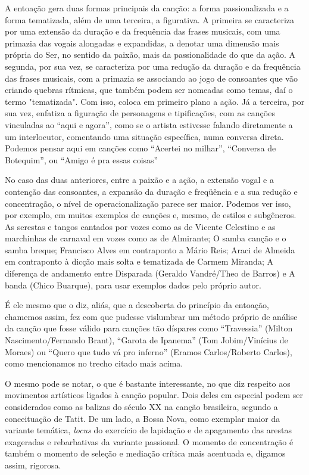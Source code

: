 A entoação gera duas formas principais da canção: a forma passionalizada
e a forma tematizada, além de uma terceira, a figurativa. A primeira se
caracteriza por uma extensão da duração e da frequência das frases
musicais, com uma primazia das vogais alongadas e expandidas, a denotar
uma dimensão mais própria do Ser, no sentido da paixão, mais da
passionalidade do que da ação. A segunda, por sua vez, se caracteriza
por uma redução da duração e da frequência das frases musicais, com a
primazia se associando ao jogo de consoantes que vão criando quebras
rítmicas, que também podem ser nomeadas como temas, daí o termo
"tematizada". Com isso, coloca em primeiro plano a ação. Já a terceira,
por sua vez, enfatiza a figuração de personagens e tipificações, com as
canções vinculadas ao ``aqui e agora'', como se o artista estivesse
falando diretamente a um interlocutor, comentando uma situação
específica, numa conversa direta. Podemos pensar aqui em canções como
``Acertei no milhar'', ``Conversa de Botequim'', ou ``Amigo é pra essas
coisas''

No caso das duas anteriores, entre a paixão e a ação, a extensão vogal e
a contenção das consoantes, a expansão da duração e freqüência e a sua
redução e concentração, o nível de operacionalização parece ser maior.
Podemos ver isso, por exemplo, em muitos exemplos de canções e, mesmo,
de estilos e subgêneros. As serestas e tangos cantados por vozes como as
de Vicente Celestino e as marchinhas de carnaval em vozes como as de
Almirante; O samba canção e o samba breque; Francisco Alves em
contraponto a Mário Reis; Araci de Almeida em contraponto à dicção mais
solta e tematizada de Carmem Miranda; A diferença de andamento entre
Disparada (Geraldo Vandré/Theo de Barros) e A banda (Chico Buarque),
para usar exemplos dados pelo próprio autor.

É ele mesmo que o diz, aliás, que a descoberta do princípio da entoação,
chamemos assim, fez com que pudesse vislumbrar um método próprio de
análise da canção que fosse válido para canções tão díspares como
``Travessia'' (Milton Nascimento/Fernando Brant), ``Garota de Ipanema''
(Tom Jobim/Vinícius de Moraes) ou ``Quero que tudo vá pro inferno''
(Eramos Carlos/Roberto Carlos), como mencionamos no trecho citado mais
acima.

O mesmo pode se notar, o que é bastante interessante, no que diz
respeito aos movimentos artísticos ligados à canção popular. Dois deles
em especial podem ser considerados como as balizas do século XX na
canção brasileira, segundo a conceituação de Tatit. De um lado, a Bossa
Nova, como exemplar maior da variante temática, \emph{locus} do
exercício de lapidação e de apagamento das arestas exageradas e
rebarbativas da variante passional. O momento de concentração é também o
momento de seleção e mediação crítica mais acentuada e, digamos assim,
rigorosa.

